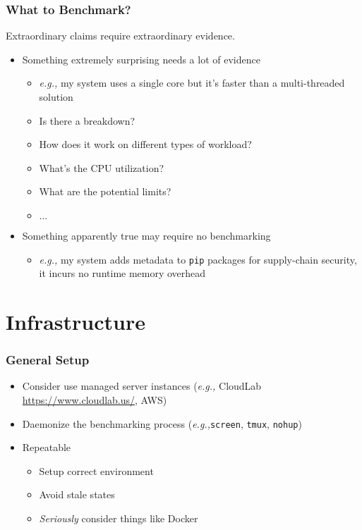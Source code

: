 \documentclass[xcolor={dvipsnames},aspectratio=149]{beamer}
\def\eg{\emph{e.g.,}\xspace}
\begin{document}
\begin{frame}
  \frametitle{What to Benchmark?}
  Extraordinary claims require extraordinary evidence.
  \begin{itemize}
  \item Something extremely surprising needs a lot of evidence
    \begin{itemize}
    \item \eg my system uses a single core but it's faster than a multi-threaded solution
    \item Is there a breakdown?
    \item How does it work on different types of workload?
    \item What's the CPU utilization?
    \item What are the potential limits?
    \item $\ldots$
    \end{itemize}
  \item Something apparently true may require no benchmarking
    \begin{itemize}
    \item \eg my system adds metadata to \texttt{pip} packages for supply-chain security,
      it incurs no runtime memory overhead
    \end{itemize}
  \end{itemize}
\end{frame}

\section{Infrastructure}
\begin{frame}
  \frametitle{General Setup}
  \begin{itemize}
  \item Consider use managed server instances (\eg CloudLab \url{https://www.cloudlab.us/}, AWS)
  \item Daemonize the benchmarking process (\eg \texttt{screen}, \texttt{tmux}, \texttt{nohup})
  \item Repeatable
    \begin{itemize}
    \item Setup correct environment
    \item Avoid stale states
    \item \textit{Seriously} consider things like Docker
    \end{itemize}
  \end{itemize}
\end{frame}
\end{document}
